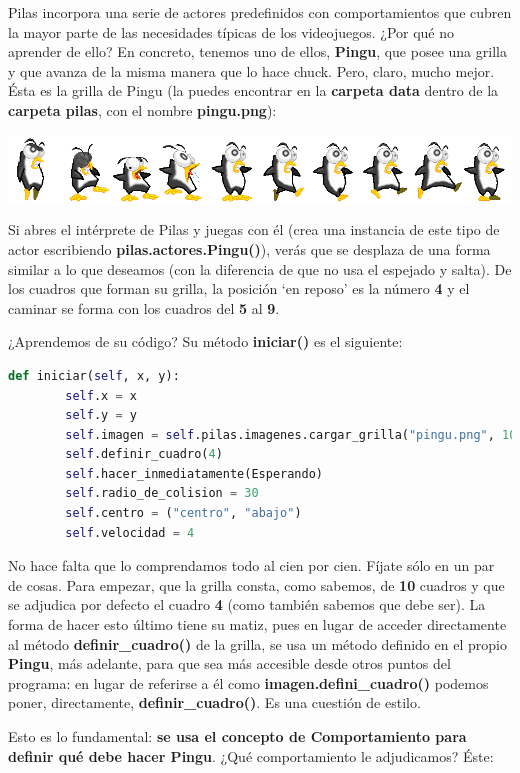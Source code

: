 \documentclass{article}
\begin{document}
Pilas incorpora una serie de actores predefinidos con comportamientos que cubren la mayor parte de las necesidades típicas de los videojuegos. ¿Por qué no aprender de ello? En concreto, tenemos uno de ellos, \textbf{Pingu}, que posee una grilla y que avanza de la misma manera que lo hace chuck. Pero, claro, mucho mejor. Ésta es la grilla de Pingu (la puedes encontrar en la \textbf{carpeta data} dentro de la \textbf{carpeta pilas}, con el nombre \textbf{pingu.png}):\par


\vspace{\baselineskip}
\includegraphics[width=\textwidth]{pingu}
\vspace{\baselineskip}

Si abres el intérprete de Pilas y juegas con él (crea una instancia de este tipo de actor escribiendo \textbf{pilas.actores.Pingu()}), verás que se desplaza de una forma similar a lo que deseamos (con la diferencia de que no usa el espejado y salta). De los cuadros que forman su grilla, la posición ‘en reposo’ es la número \textbf{4} y el caminar se forma con los cuadros del \textbf{5} al \textbf{9}.\par
¿Aprendemos de su código? Su método \textbf{iniciar()} es el siguiente:\par

\begin{lstlisting}[language=Python]
 def iniciar(self, x, y):
        self.x = x
        self.y = y
        self.imagen = self.pilas.imagenes.cargar_grilla("pingu.png", 10)
        self.definir_cuadro(4)
        self.hacer_inmediatamente(Esperando)
        self.radio_de_colision = 30
        self.centro = ("centro", "abajo")
        self.velocidad = 4
\end{lstlisting}
\vspace{\baselineskip}  

No hace falta que lo comprendamos todo al cien por cien. Fíjate sólo en un par de cosas.
Para empezar, que la grilla consta, como sabemos, de \textbf{10} cuadros y que se adjudica por
defecto el cuadro \textbf{4} (como también sabemos que debe ser). La forma de hacer esto último
tiene su matiz, pues en lugar de acceder directamente al método \textbf{definir\_cuadro()} de la
grilla, se usa un método definido en el propio \textbf{Pingu}, más adelante, para que sea más
accesible desde otros puntos del programa: en lugar de referirse a él como
\textbf{imagen.defini\_cuadro()} podemos poner, directamente, \textbf{definir\_cuadro()}. Es una
cuestión de estilo.\par
Esto es lo fundamental: \textbf{se usa el concepto de Comportamiento
para definir qué debe hacer Pingu}. ¿Qué comportamiento le adjudicamos? Éste:
\end{document}
